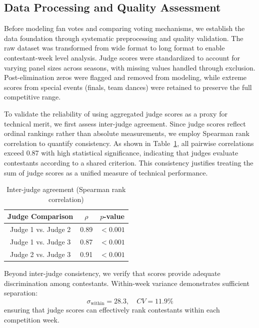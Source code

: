 \documentclass{mcmthesis}
\begin{document}
\subsection{Data Processing and Quality Assessment}

Before modeling fan votes and comparing voting mechanisms, we establish the data foundation through systematic preprocessing and quality validation. The raw dataset was transformed from wide format to long format to enable contestant-week level analysis. Judge scores were standardized to account for varying panel sizes across seasons, with missing values handled through exclusion. Post-elimination zeros were flagged and removed from modeling, while extreme scores from special events (finals, team dances) were retained to preserve the full competitive range.

To validate the reliability of using aggregated judge scores as a proxy for technical merit, we first assess inter-judge agreement. Since judge scores reflect ordinal rankings rather than absolute measurements, we employ Spearman rank correlation to quantify consistency. As shown in Table~\ref{tab:judge_correlation}, all pairwise correlations exceed 0.87 with high statistical significance, indicating that judges evaluate contestants according to a shared criterion. This consistency justifies treating the sum of judge scores as a unified measure of technical performance.

\begin{table}[H]
\centering
\caption{Inter-judge agreement (Spearman rank correlation)}
\label{tab:judge_correlation}
\begin{tabular}{ccc}
\toprule
Judge Comparison & $\rho$ & $p$-value \\
\midrule
Judge 1 vs. Judge 2 & 0.89 & $< 0.001$ \\
Judge 1 vs. Judge 3 & 0.87 & $< 0.001$ \\
Judge 2 vs. Judge 3 & 0.91 & $< 0.001$ \\
\bottomrule
\end{tabular}
\end{table}

Beyond inter-judge consistency, we verify that scores provide adequate discrimination among contestants. Within-week variance demonstrates sufficient separation:
\begin{equation}
\sigma_{\text{within}} = 28.3, \quad CV = 11.9\%
\end{equation}
ensuring that judge scores can effectively rank contestants within each competition week.
\end{document}
